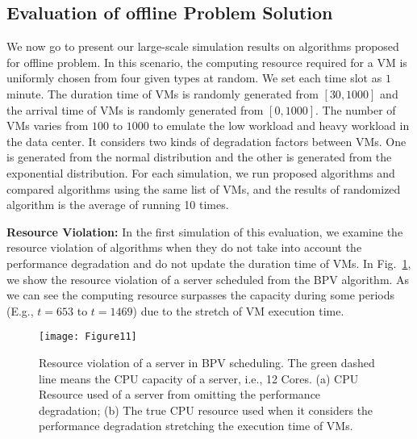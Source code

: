 \documentclass[10pt,journal]{IEEEtran}
\begin{document}
\subsection{Evaluation of offline Problem Solution}
We now go to present our large-scale simulation results on algorithms proposed for offline problem. In this scenario, the computing resource required for a VM is uniformly chosen from four given types at random. We set each time slot as $1$ minute. The duration time of VMs is randomly generated from $[30,1000]$ and the arrival time of VMs is randomly generated from $[0,1000]$. The number of VMs varies from $100$ to $1000$ to emulate the low workload and heavy workload in the data center. It considers two kinds of degradation factors between VMs. One is generated from the normal distribution and the other is generated from the exponential distribution. For each simulation, we run proposed algorithms and compared algorithms using the same list of VMs, and the results of randomized algorithm is the average of running 10 times.


\textbf{Resource Violation:} In the first simulation of this evaluation, we examine the resource violation of algorithms when they do not take into account the performance degradation and do not update the duration time of VMs. In Fig.~\ref{fig:eva_resource_violation}, we show the resource violation of a server scheduled from the BPV algorithm. As we can see the computing resource surpasses the capacity during some periods (E.g., $t=653$ to $t=1469$) due to the stretch of VM execution time.
\begin{figure}[htbp]
\centering
\texttt{[image: Figure11]}
\centering
\caption{\label{fig:eva_resource_violation}Resource violation of a server in BPV scheduling. The green dashed line means the CPU capacity of a server, i.e., 12 Cores. (a) CPU Resource used of a server from omitting the performance degradation; (b) The true CPU resource used when it considers the performance degradation stretching the execution time of VMs.}
\end{figure}
\end{document}
